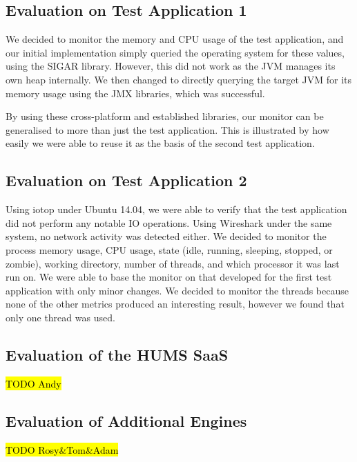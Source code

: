 \documentclass[10pt,a4paper]{article}
\begin{document}
\subsection{Evaluation on Test Application 1}
\label{sec:test_app1}

We decided to monitor the memory and CPU usage of the test application, and our initial implementation simply queried the operating system for these values, using the SIGAR library. However, this did not work as the JVM manages its own heap internally. We then changed to directly querying the target JVM for its memory usage using the JMX libraries, which was successful.

By using these cross-platform and established libraries, our monitor can be generalised to more than just the test application. This is illustrated by how easily we were able to reuse it as the basis of the second test application.

\subsection{Evaluation on Test Application 2}
\label{sec:test_app2}

Using iotop under Ubuntu 14.04, we were able to verify that the test application did not perform any notable IO operations. Using Wireshark under the same system, no network activity was detected either.
We decided to monitor the process memory usage, CPU usage, state (idle, running, sleeping, stopped, or zombie), working directory, number of threads, and which processor it was last run on. We were able to base the monitor on that developed for the first test application with only minor changes. We decided to monitor the threads because none of the other metrics produced an interesting result, however we found that only one thread was used.

\subsection{Evaluation of the HUMS SaaS}
\label{sec:hums_saas}
\hl{TODO Andy}


\subsection{Evaluation of Additional Engines}
\label{sec:additional}
\hl{TODO Rosy\&Tom\&Adam}

\end{document}
